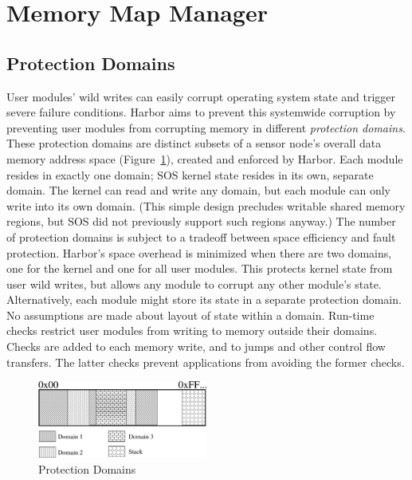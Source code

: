 \section{Memory Map Manager}
\label{chap:memmap}
%
\subsection{Protection Domains}
% 
User modules' wild writes can easily corrupt operating system state
and trigger severe failure conditions.
% 
Harbor aims to prevent this systemwide corruption by
% 
preventing user modules
from corrupting memory in different \emph{protection domains}.
% 
% 
These protection domains are
% 
distinct subsets of a sensor node's overall data memory address space
(Figure~\ref{fig:prot_domains}), created and enforced by Harbor.
% 
Each module resides in exactly one domain; SOS kernel state resides in
its own, separate domain.
% 
The kernel can read and write any domain, but each module can only write
into its own domain.
% 
(This simple design precludes writable shared memory regions, but SOS did
not previously support such regions anyway.)
% 
The number of protection domains is subject to a tradeoff between space
efficiency and fault protection.
%
Harbor's space overhead is minimized when there are two domains, one
for the kernel and one for all user modules.
%
This protects kernel state from user wild writes, but allows any
module to corrupt any other module's state.
%
Alternatively, each module might store its state in a separate
protection domain.
% 
No assumptions are made about layout of state within a domain.
% 
Run-time checks restrict user modules from writing to memory outside
their domains.
% 
Checks are added to each memory write, and to jumps and other control
flow transfers.  
%
The latter checks prevent applications from avoiding the former
checks.
\begin{figure}[htbp]
  \centering
  \includegraphics[height = 1.0in,
  keepaspectratio=true]{figures/domains.eps} 
  \caption{Protection Domains}
  \label{fig:prot_domains}
\end{figure}


